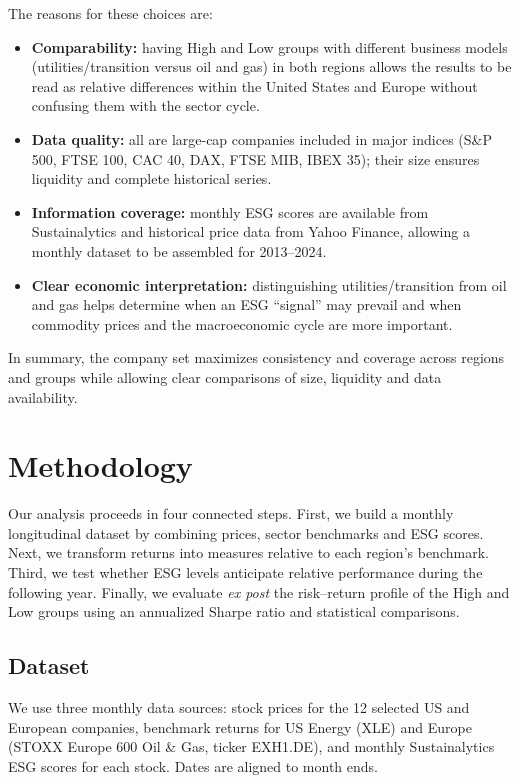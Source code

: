 \documentclass[12pt,a4paper]{article}
\begin{document}
The reasons for these choices are:

\begin{itemize}
\item \textbf{Comparability:} having High and Low groups with different business models (utilities/transition versus oil and gas) in both regions allows the results to be read as relative differences within the United States and Europe without confusing them with the sector cycle.
\item \textbf{Data quality:} all are large-cap companies included in major indices (S\&P 500, FTSE 100, CAC 40, DAX, FTSE MIB, IBEX 35); their size ensures liquidity and complete historical series.
\item \textbf{Information coverage:} monthly ESG scores are available from Sustainalytics and historical price data from Yahoo Finance, allowing a monthly dataset to be assembled for 2013--2024.
\item \textbf{Clear economic interpretation:} distinguishing utilities/transition from oil and gas helps determine when an ESG ``signal'' may prevail and when commodity prices and the macroeconomic cycle are more important.
\end{itemize}

In summary, the company set maximizes consistency and coverage across regions and groups while allowing clear comparisons of size, liquidity and data availability.

\section{Methodology}

Our analysis proceeds in four connected steps. First, we build a monthly longitudinal dataset by combining prices, sector benchmarks and ESG scores. Next, we transform returns into measures relative to each region's benchmark. Third, we test whether ESG levels anticipate relative performance during the following year. Finally, we evaluate \textit{ex post} the risk--return profile of the High and Low groups using an annualized Sharpe ratio and statistical comparisons.

\subsection{Dataset}

We use three monthly data sources: stock prices for the 12 selected US and European companies, benchmark returns for US Energy (XLE) and Europe (STOXX Europe 600 Oil \& Gas, ticker EXH1.DE), and monthly Sustainalytics ESG scores for each stock. Dates are aligned to month ends.
\end{document}
